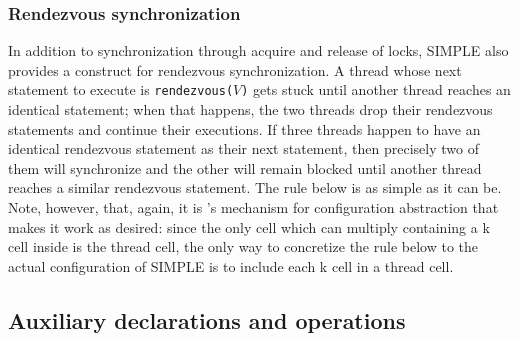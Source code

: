 \documentclass{article}
\begin{document}
\begin{kdefinition}
\begin{module}{}
\begin{kblock}[text]
 \subsubsection{Rendezvous synchronization}
In addition to synchronization through acquire and release of locks, SIMPLE
also provides a construct for rendezvous synchronization.  A thread whose next
statement to execute is \texttt{rendezvous($V$)} gets stuck until another
thread reaches an identical statement; when that happens, the two threads
drop their rendezvous statements and continue their executions.  If three
threads happen to have an identical rendezvous statement as their next
statement, then precisely two of them will synchronize and the other will
remain blocked until another thread reaches a similar rendezvous statement.
The rule below is as simple as it can be.  Note, however, that, again, it is
\K's mechanism for configuration abstraction that makes it work as desired:
since the only cell which can multiply containing a \textsf{k} cell inside is
the \textsf{thread} cell, the only way to concretize the rule below to the
actual configuration of SIMPLE is to include each \textsf{k} cell in a
\textsf{thread} cell. \end{kblock}
\begin{kblock}[text]
 \section{Auxiliary declarations and operations}\end{kblock}
\begin{kblock}[text]

\end{kblock}
\end{module}
\end{kdefinition}
\end{document}
